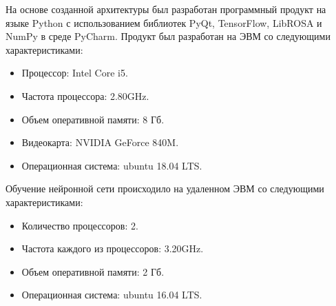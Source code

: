 На основе созданной архитектуры был разработан программный продукт на языке Python с использованием библиотек PyQt, TensorFlow, LibROSA и NumPy в среде PyCharm. Продукт был разработан на ЭВМ со следующими характеристиками:

\begin{itemize}
	\item Процессор: Intel Core i5.
	\item Частота процессора: 2.80GHz.
	\item Объем оперативной памяти: 8 Гб.
	\item Видеокарта: NVIDIA GeForce 840M.
	\item Операционная система: ubuntu 18.04 LTS.
\end{itemize}

Обучение нейронной сети происходило на удаленном ЭВМ со следующими характеристиками:

\begin{itemize}
	\item Количество процессоров: 2.
	\item Частота каждого из процессоров: 3.20GHz.
	\item Объем оперативной памяти: 2 Гб.
	\item Операционная система: ubuntu 16.04 LTS.
\end{itemize}

